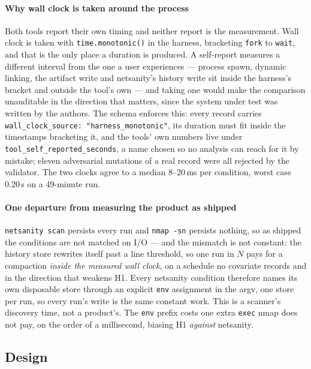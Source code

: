 \documentclass[conference]{IEEEtran}
\newcommand{\netsanity}{\textsf{netsanity}}
\newcommand{\nmapsn}{\texttt{nmap -sn}}
\begin{document}
\paragraph*{Why wall clock is taken around the process} Both tools report their
own timing and neither report is the measurement. Wall clock is taken with
\texttt{time.monotonic()} in the harness, bracketing \texttt{fork} to
\texttt{wait}, and that is the only place a duration is produced. A self-report
measures a different interval from the one a user experiences --- process
spawn, dynamic linking, the artifact write and \netsanity{}'s history write sit
inside the harness's bracket and outside the tool's own --- and taking one
would make the comparison unauditable in the direction that matters, since the
system under test was written by the authors. The schema enforces this: every
record carries \texttt{wall\_clock\_source:\,"harness\_mo\-no\-tonic"}, its
duration must fit inside the timestamps bracketing it, and the tools' own
numbers live under \texttt{tool\_self\_reported\_seconds}, a name chosen so no
analysis can reach for it by mistake; eleven adversarial mutations of a real
record were all rejected by the validator. The two clocks agree to a median
8--20\,ms per condition, worst case 0.20\,s on a 49-minute run.

\paragraph*{One departure from measuring the product as shipped}
\texttt{netsanity scan} persists every run and \nmapsn{} persists nothing, so
as shipped the conditions are not matched on I/O --- and the mismatch is not
constant: the history store rewrites itself past a line threshold, so one run
in $N$ pays for a compaction \emph{inside the measured wall clock}, on a
schedule no covariate records and in the direction that weakens H1. Every
\netsanity{} condition therefore names its own disposable store through an
explicit \texttt{env} assignment in the argv, one store per run, so every run's
write is the same constant work. This is a scanner's discovery time, not a
product's. The \texttt{env} prefix costs one extra \texttt{exec} nmap does not
pay, on the order of a millisecond, biasing H1 \emph{against} \netsanity{}.

\subsection{Design}
\label{sec:design}
\end{document}
